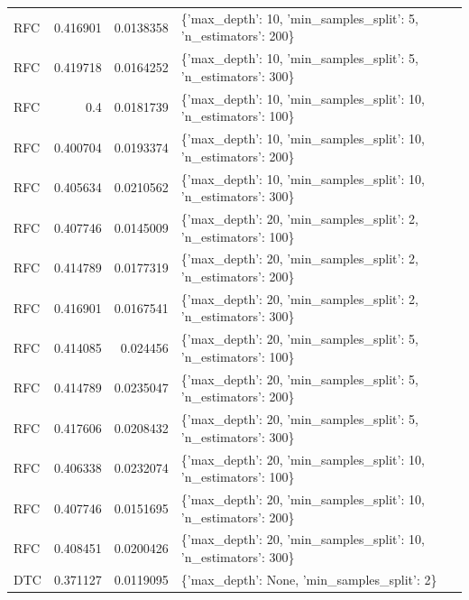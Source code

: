 \documentclass[conference,onecolumn]{IEEEtran}
\begin{document}
\begin{table}[H]
\begin{center}
\begin{longtable}{lrrl}
             RFC          &   0.416901 &       0.0138358  & \{'max\_depth': 10, 'min\_samples\_split': 5, 'n\_estimators': 200\}    \\
             RFC          &   0.419718 &       0.0164252  & \{'max\_depth': 10, 'min\_samples\_split': 5, 'n\_estimators': 300\}    \\
             RFC          &   0.4      &       0.0181739  & \{'max\_depth': 10, 'min\_samples\_split': 10, 'n\_estimators': 100\}   \\
             RFC          &   0.400704 &       0.0193374  & \{'max\_depth': 10, 'min\_samples\_split': 10, 'n\_estimators': 200\}   \\
             RFC          &   0.405634 &       0.0210562  & \{'max\_depth': 10, 'min\_samples\_split': 10, 'n\_estimators': 300\}   \\
             RFC          &   0.407746 &       0.0145009  & \{'max\_depth': 20, 'min\_samples\_split': 2, 'n\_estimators': 100\}    \\
             RFC          &   0.414789 &       0.0177319  & \{'max\_depth': 20, 'min\_samples\_split': 2, 'n\_estimators': 200\}    \\
             RFC          &   0.416901 &       0.0167541  & \{'max\_depth': 20, 'min\_samples\_split': 2, 'n\_estimators': 300\}    \\
             RFC          &   0.414085 &       0.024456   & \{'max\_depth': 20, 'min\_samples\_split': 5, 'n\_estimators': 100\}    \\
             RFC          &   0.414789 &       0.0235047  & \{'max\_depth': 20, 'min\_samples\_split': 5, 'n\_estimators': 200\}    \\
             RFC          &   0.417606 &       0.0208432  & \{'max\_depth': 20, 'min\_samples\_split': 5, 'n\_estimators': 300\}    \\
             RFC          &   0.406338 &       0.0232074  & \{'max\_depth': 20, 'min\_samples\_split': 10, 'n\_estimators': 100\}   \\
             RFC          &   0.407746 &       0.0151695  & \{'max\_depth': 20, 'min\_samples\_split': 10, 'n\_estimators': 200\}   \\
             RFC          &   0.408451 &       0.0200426  & \{'max\_depth': 20, 'min\_samples\_split': 10, 'n\_estimators': 300\}   \\
             DTC          &   0.371127 &       0.0119095  & \{'max\_depth': None, 'min\_samples\_split': 2\}                       \\

\end{longtable}
\end{center}
\end{table}
\end{document}
